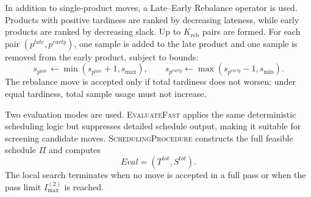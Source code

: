 \documentclass[11pt]{article}
\begin{document}
In addition to single-product moves, a Late--Early Rebalance operator is used. Products with positive tardiness are ranked by decreasing lateness, while early products are ranked by decreasing slack. Up to \(K_{\mathrm{reb}}\) pairs are formed. For each pair \((p^{late},p^{early})\), one sample is added to the late product and one sample is removed from the early product, subject to bounds:
\[
s_{p^{late}}\leftarrow \min(s_{p^{late}}+1,s_{\max}),
\qquad
s_{p^{early}}\leftarrow \max(s_{p^{early}}-1,s_{\min}).
\]
The rebalance move is accepted only if total tardiness does not worsen; under equal tardiness, total sample usage must not increase.

Two evaluation modes are used. \textsc{EvaluateFast} applies the same deterministic scheduling logic but suppresses detailed schedule output, making it suitable for screening candidate moves. \textsc{SchedulingProcedure} constructs the full feasible schedule \(\Pi\) and computes
\[
Eval=(T^{tot},S^{tot}).
\]
The local search terminates when no move is accepted in a full pass or when the pass limit \(I_{\max}^{(2)}\) is reached.
\end{document}
